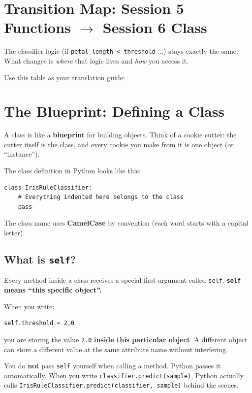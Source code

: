 \section{Transition Map: Session 5 Functions $\rightarrow$ Session 6 Class}

The classifier logic (if \texttt{petal\_length < threshold} ...) stays exactly the same.
What changes is \textit{where} that logic lives and \textit{how} you access it.

\medskip
\noindent
Use this table as your translation guide:



\section{The Blueprint: Defining a Class}

A class is like a \textbf{blueprint} for building objects.
Think of a cookie cutter: the cutter itself is the class, and every cookie you make from it is one object (or ``instance'').

\medskip
\noindent
The class definition in Python looks like this:

\begin{verbatim}
class IrisRuleClassifier:
    # Everything indented here belongs to the class
    pass
\end{verbatim}

\noindent
The class name uses \textbf{CamelCase} by convention (each word starts with a capital letter).

\subsection{What is \texttt{self}?}

Every method inside a class receives a special first argument called \texttt{self}.
\textbf{\texttt{self} means ``this specific object''.}

\medskip
\noindent
When you write:

\begin{verbatim}
self.threshold = 2.0
\end{verbatim}

\noindent
you are storing the value \texttt{2.0} \textbf{inside this particular object}.
A different object can store a different value at the same attribute name without interfering.

\medskip
\noindent
You do \textbf{not} pass \texttt{self} yourself when calling a method.
Python passes it automatically.
When you write \texttt{classifier.predict(sample)}, Python actually calls
\texttt{IrisRuleClassifier.predict(classifier, sample)} behind the scenes.

